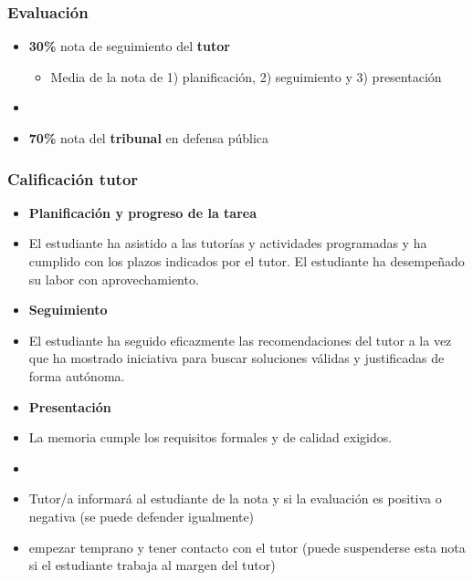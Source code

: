 \documentclass[utf8, xcolor=dvipsnames]{beamer}
\begin{document}
\begin{frame}
\frametitle{Evaluación}
\centering

\begin{itemize}
  \item \textbf{30\%} nota de seguimiento del \textbf{tutor}
  \begin{itemize}
    \item Media de la nota de 1) planificación, 2) seguimiento y 3) presentación
  \end{itemize}
  \item[]
  \item \textbf{70\%} nota del \textbf{tribunal} en defensa pública
\end{itemize}

\end{frame}

\begin{frame}
\frametitle{Calificación tutor}
\centering

\begin{itemize}
  \item \textbf{Planificación y progreso de la tarea}
  \item[] {\small El estudiante ha asistido a las tutorías y actividades programadas y ha cumplido con los plazos indicados por el tutor. El estudiante ha desempeñado su labor con aprovechamiento.}
  \item \textbf{Seguimiento}
  \item[] {\small El estudiante ha seguido eficazmente las recomendaciones del tutor a la vez que ha mostrado iniciativa para buscar soluciones válidas y justificadas de forma autónoma.}
  \item \textbf{Presentación}
  \item[] {\small La memoria cumple los requisitos formales y de calidad exigidos.}
  \item[]
  \item Tutor/a informará al estudiante de la nota y si la evaluación es positiva o negativa (se puede defender igualmente)
  \item \textbf{{\color{red}{Importante}}} empezar temprano y tener contacto con el tutor (puede suspenderse esta nota si el estudiante trabaja al margen del tutor)
\end{itemize}

\end{frame}
\end{document}
